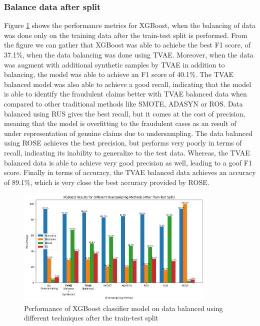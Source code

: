 \documentclass[twoside,11pt]{article}
\begin{document}
\subsubsection{Balance data after split} \label{sec:afterSplit}
Figure \ref{fig:xgboost_oversample_after_split} shows the performance metrics for XGBoost, when the balancing of data was done only on the training data after the train-test split is performed. From the figure we can gather that XGBoost was able to achiebe the best F1 score, of 37.1\%, when the data balancing was done using TVAE. Moreover, when the data was augment with additional synthetic samples by TVAE in addition to balancing, the model was able to achieve an F1 score of 40.1\%. The TVAE balanced model was also able to achieve a good recall, indicating that the model is able to identify the fraudulent claims better with TVAE balanced data when compared to other traditional methods like SMOTE, ADASYN or ROS. Data balanced using RUS gives the best recall, but it comes at the cost of precision, meaning that the model is overfitting to the fraudulent cases as an result of under representation of genuine claims due to undersampling.  The data balanced using ROSE achieves the best precision, but performs very poorly in terms of recall, indicating its inability to generalize to the test data. Whereas, the TVAE balanced data is able to achieve very good precision as well, leading to a goof F1 score. Finally in terms of accuracy, the TVAE balanced data achieves an accuracy of 89.1\%, which is very close the best accuracy provided by ROSE.
\begin{figure}
  \centering
  \includegraphics[width=0.85\textwidth]{images/xgboost_oversample_after_split.png}
  \caption{Performance of XGBoost classifier model on data balanced using different techniques after the train-test split}
  \label{fig:xgboost_oversample_after_split}
\end{figure}
\end{document}
